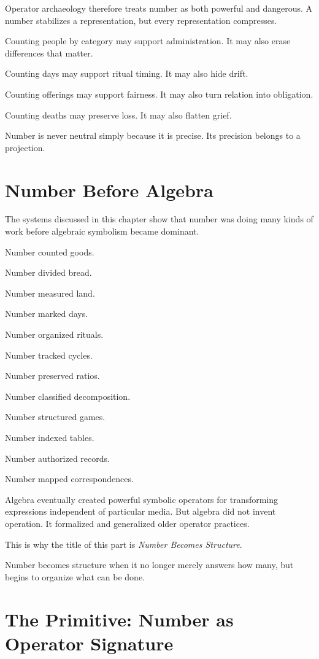 \documentclass[11pt]{book}
\begin{document}
Operator archaeology therefore treats number as both powerful and dangerous. A number stabilizes a representation, but every representation compresses.

Counting people by category may support administration. It may also erase differences that matter.

Counting days may support ritual timing. It may also hide drift.

Counting offerings may support fairness. It may also turn relation into obligation.

Counting deaths may preserve loss. It may also flatten grief.

Number is never neutral simply because it is precise. Its precision belongs to a projection.

\section{Number Before Algebra}

The systems discussed in this chapter show that number was doing many kinds of work before algebraic symbolism became dominant.

Number counted goods.

Number divided bread.

Number measured land.

Number marked days.

Number organized rituals.

Number tracked cycles.

Number preserved ratios.

Number classified decomposition.

Number structured games.

Number indexed tables.

Number authorized records.

Number mapped correspondences.

Algebra eventually created powerful symbolic operators for transforming expressions independent of particular media. But algebra did not invent operation. It formalized and generalized older operator practices.

This is why the title of this part is \emph{Number Becomes Structure}.

Number becomes structure when it no longer merely answers how many, but begins to organize what can be done.

\section{The Primitive: Number as Operator Signature}
\end{document}
